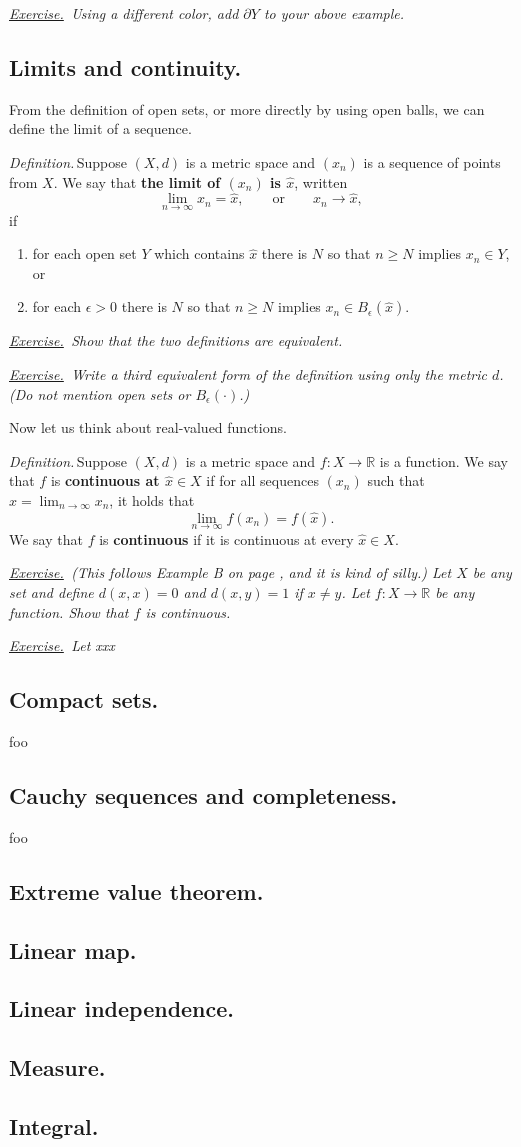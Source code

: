 \documentclass[12pt]{article}
\newcommand{\RR}{\mathbb{R}}
\newcommand{\eps}{\epsilon}
\newcommand{\sect}[1]{\subsection*{#1.}}
\newcommand{\defin}{\emph{Definition.}\,}
\newcommand{\exer}[2]{\emph{\underline{Exercise.}\, #2} \vspace*{#1mm}}
\begin{document}
\exer{1}{Using a different color, add $\partial Y$ to your above example.}


\sect{Limits and continuity}

From the definition of open sets, or more directly by using open balls, we can define the limit of a sequence.

\defin Suppose $(X,d)$ is a metric space and $(x_n)$ is a sequence of points from $X$.  We say that \textbf{the limit of $(x_n)$ is $\hat x$}, written
	$$\lim_{n\to\infty} x_n = \hat x, \qquad \text{or} \qquad x_n \to \hat x,$$
if
\begin{enumerate}
\item for each open set $Y$ which contains $\hat x$ there is $N$ so that $n\ge N$ implies $x_n \in Y$, or
\item for each $\eps>0$ there is $N$ so that $n\ge N$ implies $x_n \in B_\eps(\hat x)$.
\end{enumerate}

\exer{30}{Show that the two definitions are equivalent.}

\clearpage\newpage
\exer{40}{Write a third equivalent form of the definition using only the metric $d$.  (Do not mention open sets or $B_\eps(\cdot)$.)}

Now let us think about real-valued functions.

\defin Suppose $(X,d)$ is a metric space and $f:X\to \RR$ is a function.  We say that $f$ is \textbf{continuous at $\hat x\in X$} if for all sequences $(x_n)$ such that $\hat x = \lim_{n\to\infty} x_n$, it holds that
    $$\lim_{n\to\infty} f(x_n) = f(\hat x).$$
We say that $f$ is \textbf{continuous} if it is continuous at every $\hat x\in X$.

\exer{40}{(This follows Example B on page \pageref{topic:metric}, and it is kind of silly.)  Let $X$ be any set and define $d(x,x)=0$ and $d(x,y)=1$ if $x\ne y$.  Let $f:X\to\RR$ be any function.  Show that $f$ is continuous.}

\exer{40}{Let xxx}



\sect{Compact sets}

foo


\sect{Cauchy sequences and completeness}

foo


\sect{Extreme value theorem}

\sect{Linear map}

\sect{Linear independence}

\sect{Measure}

\sect{Integral}
\end{document}
